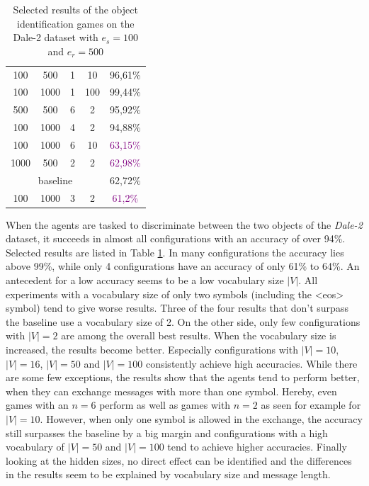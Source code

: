 \begin{table}[ht]
\begin{tabular}{cccc|c}
        {100}                         & {500}     & {1} & {10}  & {96,61\%}                           \\
        {100}                         & {1000}    & {1} & {100} & {99,44\%}                           \\
        {500}                         & {500}     & {6} & {2}   & {95,92\%}                           \\
        {100}                         & {1000}    & {4} & {2}   & {94,88\%}                           \\
        {100}                         & {1000}    & {6} & {10}  & \textcolor{purple}{63,15\%}         \\
        {1000}                        & {500}     & {2} & {2}   & \textcolor{purple}{62,98\%}         \\\midrule
        \multicolumn{4}{c|}{baseline} & {62,72\%}                                                     \\\midrule
        {100}                         & {1000}    & {3} & {2}   & \textcolor{purple}{61,2\%}          \\
        \bottomrule
    \end{tabular}
    \caption{Selected results of the object identification games on the Dale-2 dataset with $e_s=100$ and $e_r=500$}
    \label{tab:results_discriminator_dale-2}
\end{table}

When the agents are tasked to discriminate between the two objects of the \emph{Dale-2} dataset, it succeeds in almost all configurations with an accuracy of over 94\%.
Selected results are listed in Table \ref{tab:results_discriminator_dale-2}.
In many configurations the accuracy lies above 99\%, while only 4 configurations have an accuracy of only 61\% to 64\%.
An antecedent for a low accuracy seems to be a low vocabulary size $|V|$.
All experiments with a vocabulary size of only two symbols (including the <eos> symbol) tend to give worse results.
Three of the four results that don't surpass the baseline use a vocabulary size of 2.
On the other side, only few configurations with $|V| = 2$ are among the overall best results.
When the vocabulary size is increased, the results become better.
Especially configurations with $|V| = 10$, $|V| = 16$, $|V| = 50$ and $|V| = 100$ consistently achieve high accuracies.
While there are some few exceptions, the results show that the agents tend to perform better, when they can exchange messages with more than one symbol.
Hereby, even games with an $n = 6$ perform as well as games with $n = 2$ as seen for example for $|V| = 10$.
However, when only one symbol is allowed in the exchange, the accuracy still surpasses the baseline by a big margin and configurations with a high vocabulary of $|V| = 50$ and $|V| = 100$ tend to achieve higher accuracies.
Finally looking at the hidden sizes, no direct effect can be identified and the differences in the results seem to be explained by vocabulary size and message length.

